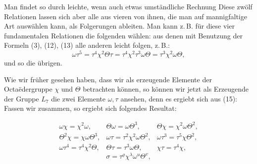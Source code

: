 Man findet so durch leichte, wenn auch etwas umständliche
Rechnung
Diese zwölf Relationen lassen sich aber alle aus vieren von
ihnen, die man auf mannigfaltige Art auswählen kann, als Folgerungen
 ableiten. Man kann z.\,B. für diese vier fundamentalen
Relationen die folgenden wählen:
aus denen mit Benutzung der Formeln (3), (12), (13) alle anderen
leicht folgen, z.\,B.:
\[
\omega\tau^5 = \tau^4\chi^2\Theta\tau = \tau^4\chi^2\tau^3\omega\Theta = \tau^3\chi^2\omega\Theta,
\]
und so die übrigen.

Wie wir früher gesehen haben, dass wir als erzeugende
Elemente der Octa\"edergruppe $\chi$ und $\Theta$ betrachten können, so
können wir jetzt als Erzeugende der Gruppe $L_7$ die zwei Elemente
 $\omega, \tau$ ansehen, denn es ergiebt sich aus (15):
Fassen wir zusammen, so ergiebt sich folgendes Resultat:

\[
\begin{array}{ccc}
\omega\chi = \chi^2\omega, & \Theta\omega = \omega\Theta^3, & \Theta\chi = \chi^2\omega\Theta^2,\\
\Theta^2\chi = \chi\omega\Theta^3, & \omega\tau = \tau^2\chi^2\omega\Theta^2, & \omega\tau^3 = \tau^5\chi\Theta^2,\\
\omega\tau^4 = \tau^4\chi^2\Theta, & \Theta\tau = \tau^3\omega\Theta, & \chi\tau = \tau^4\chi,
\end{array}
\]
\[
\sigma = \tau^\varrho \chi^\lambda \omega^u \Theta^v,
\]
